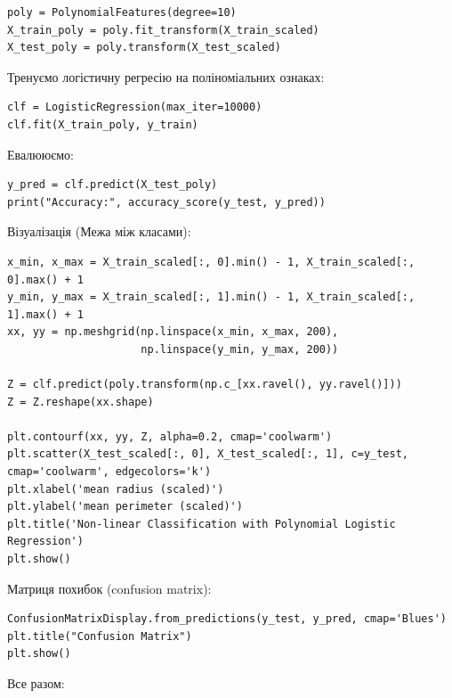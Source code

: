 \begin{lstlisting}
poly = PolynomialFeatures(degree=10)
X_train_poly = poly.fit_transform(X_train_scaled)
X_test_poly = poly.transform(X_test_scaled)
\end{lstlisting}

Тренуємо логістичну регресію на поліноміальних ознаках:

\begin{lstlisting}
clf = LogisticRegression(max_iter=10000)
clf.fit(X_train_poly, y_train)
\end{lstlisting}

Евалююємо:

\begin{lstlisting}
y_pred = clf.predict(X_test_poly)
print("Accuracy:", accuracy_score(y_test, y_pred))
\end{lstlisting}

Візуалізація (Межа між класами):

\begin{lstlisting}
x_min, x_max = X_train_scaled[:, 0].min() - 1, X_train_scaled[:, 0].max() + 1
y_min, y_max = X_train_scaled[:, 1].min() - 1, X_train_scaled[:, 1].max() + 1
xx, yy = np.meshgrid(np.linspace(x_min, x_max, 200),
                     np.linspace(y_min, y_max, 200))

Z = clf.predict(poly.transform(np.c_[xx.ravel(), yy.ravel()]))
Z = Z.reshape(xx.shape)

plt.contourf(xx, yy, Z, alpha=0.2, cmap='coolwarm')
plt.scatter(X_test_scaled[:, 0], X_test_scaled[:, 1], c=y_test, cmap='coolwarm', edgecolors='k')
plt.xlabel('mean radius (scaled)')
plt.ylabel('mean perimeter (scaled)')
plt.title('Non-linear Classification with Polynomial Logistic Regression')
plt.show()
\end{lstlisting}

Матриця похибок (confusion matrix):

\begin{lstlisting}
ConfusionMatrixDisplay.from_predictions(y_test, y_pred, cmap='Blues')
plt.title("Confusion Matrix")
plt.show()
\end{lstlisting}

Все разом:

